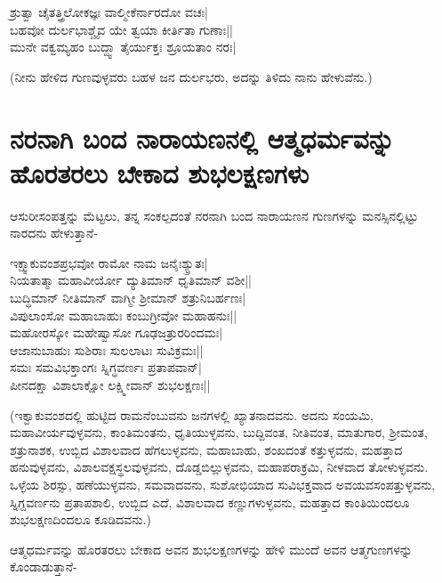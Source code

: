 \begin{shloka} 
ಶ್ರುತ್ವಾ ಚೈತತ್ತ್ರಿಲೋಕಜ್ಞಃ ವಾಲ್ಮೀಕೆರ್ನಾರದೋ ವಚಃ|\\ 
ಬಹವೋ ದುರ್ಲಭಾಶ್ಚೈವ ಯೇ ತ್ವಯಾ ಕೀರ್ತಿತಾ ಗುಣಾಃ||\\ 
ಮುನೇ ವಕ್ವಮ್ಯಹಂ ಬುದ್ದ್ವಾ ತೈರ್ಯುಕ್ತಃ ಶ್ರೂಯತಾಂ ನರಃ|
\end{shloka} 

(ನೀನು ಹೇಳಿದ ಗುಣವುಳ್ಳವರು ಬಹಳ ಜನ ದುರ್ಲಭರು, ಅದನ್ನು ತಿಳಿದು ನಾನು ಹೇಳುವೆನು.) 

\section*{ನರನಾಗಿ ಬಂದ ನಾರಾಯಣನಲ್ಲಿ ಆತ್ಮಧರ್ಮವನ್ನು ಹೊರತರಲು ಬೇಕಾದ ಶುಭಲಕ್ಷಣಗಳು} 

ಆಸುರೀಸಂಪತ್ತನ್ನು ಮೆಟ್ಟಲು, ತನ್ನ ಸಂಕಲ್ಪದಂತೆ ನರನಾಗಿ ಬಂದ ನಾರಾಯಣನ ಗುಣಗಳನ್ನು ಮನಸ್ಸಿನಲ್ಲಿಟ್ಟು ನಾರದನು ಹೇಳುತ್ತಾನೆ- 

\begin{shloka} 
ಇಕ್ಷ್ವಾಕುವಂಶಪ್ರಭವೋ ರಾಮೋ ನಾಮ ಜನೈಃಶ್ಯ್ರುತಃ|\label{154}\\ 
ನಿಯತಾತ್ಮಾ ಮಹಾವೀರ್ಯೋ ದ್ಯುತಿಮಾನ್ ಧೃತಿಮಾನ್ ವಶೀ||\\ 
ಬುದ್ಧಿಮಾನ್ ನೀತಿಮಾನ್ ವಾಗ್ಮೀ ಶ್ರೀಮಾನ್ ಶತ್ರುನಿಬರ್ಹಣಃ|\\ 
ವಿಪುಲಾಂಸೋ ಮಹಾಬಾಹುಃ ಕಂಬುಗ್ರೀವೋ ಮಹಾಹನುಃ||\\ 
ಮಹೋರಸ್ಕೋ ಮಹೇಷ್ವಾಸೋ ಗೂಢಜತ್ರುರರಿಂದಮಃ|\\ 
ಆಜಾನುಬಾಹುಃ ಸುಶಿರಾಃ ಸುಲಲಾಟಃ ಸುವಿಕ್ರಮಃ||\\ 
ಸಮಃ ಸಮವಿಭಕ್ತಾಂಗಃ ಸ್ನಿಗ್ಧವರ್ಣಃ ಪ್ರತಾಪವಾನ್|\\ 
ಪೀನದಕ್ಷಾ ವಿಶಾಲಾಕ್ಷೋ ಲಕ್ಷ್ಮೀವಾನ್ ಶುಭಲಕ್ಷಣಃ||
\end{shloka} 

(ಇಕ್ವಾಕುವಂಶದಲ್ಲಿ ಹುಟ್ಟಿದ ರಾಮನೆಂಬುವನು ಜನಗಳಲ್ಲಿ ಖ್ಯಾತನಾದವನು. ಅದನು ಸಂಯಮಿ, ಮಹಾವೀರ್ಯವುಳ್ಳವನು, ಕಾಂತಿಮಂತನು, ಧೃತಿಯುಳ್ಳವನು, ಬುದ್ದಿವಂತ, ನೀತಿವಂತ, ಮಾತುಗಾರ, ಶ್ರೀಮಂತ, ಶತ್ರುನಾಶಕ, ಉಬ್ಬಿದ ವಿಶಾಲವಾದ ಹೆಗಲುಳ್ಳವನು, ಮಹಾಬಾಹು, ಶಂಖದಂತೆ ಕತ್ತುಳ್ಳವನು, ಮಹತ್ತಾದ ಹನುವುಳ್ಳವನು, ವಿಶಾಲವಕ್ಷಸ್ಥಲವುಳ್ಳವನು, ದೊಡ್ಡಬಿಲ್ಲುಳ್ಳವನು, ಮಹಾಪರಾಕ್ರಮಿ, ನೀಳವಾದ ತೋಳುಳ್ಳವನು. ಒಳ್ಳೆಯ ಶಿರಸ್ಸು, ಹಣೆಯುಳ್ಳವನು, ಸಮವಾದವನು, ಸುಶೋಭಿಯಾದ ಸುವಿಭಕ್ತವಾದ ಅವಯವಸಂಪತ್ತುಳ್ಳವನು, ಸ್ನಿಗ್ದವರ್ಣನು ಪ್ರತಾಪಶಾಲಿ, ಉಬ್ಬಿದ ಎದೆ, ವಿಶಾಲವಾದ ಕಣ್ಣುಗಳುಳ್ಳವನು, ಮಹತ್ತಾದ ಕಾಂತಿಯಿಂದಲೂ ಶುಭಲಕ್ಷಣದಿಂದಲೂ ಕೂಡಿದವನು.) 

ಆತ್ಮಧರ್ಮವನ್ನು ಹೊರತರಲು ಬೇಕಾದ ಅವನ ಶುಭಲಕ್ಷಣಗಳನ್ನು ಹೇಳಿ ಮುಂದೆ ಅವನ ಆತ್ಮಗುಣಗಳನ್ನು ಕೊಂಡಾಡುತ್ತಾನೆ- 

